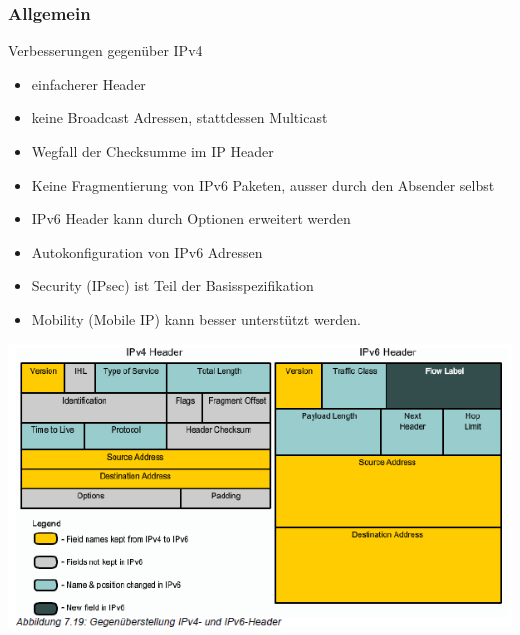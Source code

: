 \documentclass[landscape,twocolumn,a4paper]{article}
\begin{document}
\begin{footnotesize}
\subsubsection{Allgemein}
Verbesserungen gegenüber IPv4
\vspace{-3mm}
\begin{itemize}
	\item einfacherer Header
	\item keine Broadcast Adressen, stattdessen Multicast
	\item Wegfall der Checksumme im IP Header
	\item Keine Fragmentierung von IPv6 Paketen, ausser durch den Absender selbst
	\item IPv6 Header kann durch Optionen erweitert werden
	\item Autokonfiguration von IPv6 Adressen
	\item Security (IPsec) ist Teil der Basisspezifikation
	\item Mobility (Mobile IP) kann besser unterstützt werden.
\end{itemize}
\vspace{-3mm}
\includegraphics[scale=0.5]{ipv4-ipv6-headers.png}


\end{footnotesize}
\end{document}
